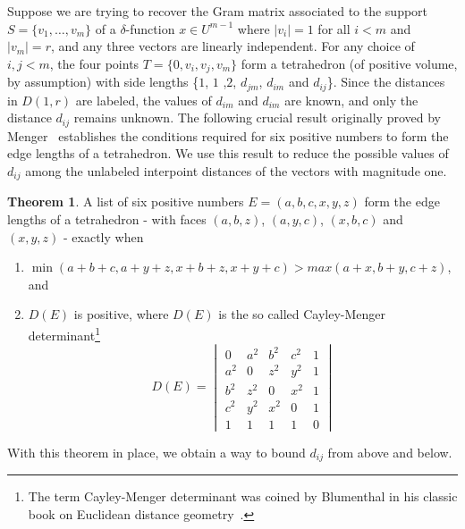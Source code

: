 \documentclass{article}
\theoremstyle{definition}
\newtheorem{Theorem}{Theorem}
\renewcommand{\|}{|}
\begin{document}
Suppose we are trying to recover
the Gram matrix associated to the support $S = \{v_1,\dots,v_m\}$ of a $\delta$-function $x \in U^{m-1}$ where $\|v_i\|=1$ for all $i<m$ and $\|v_m\|=r$,
and any three vectors are linearly independent.
For any choice of $i,j<m$, the four points $T = \{0, v_i, v_j, v_m\}$ form a tetrahedron (of positive volume, by assumption) with side lengths \{$1$, $1$ ,$2$, $d_{jm}$, $d_{im}$ and $d_{ij}$\}. Since the distances in $D(1,r)$ are labeled, the values of $d_{im}$ and $d_{im}$ are known, and only the distance $d_{ij}$ remains unknown. The following crucial result
originally proved by Menger~\cite{menger1928untersuchungen} establishes the conditions required for six positive numbers to form the edge lengths of a tetrahedron. We use this result to reduce the possible values of $d_{ij}$ among the unlabeled interpoint distances of the vectors with magnitude one.
\begin{Theorem}{\cite[Theorem 3.1]{wirth2009edge}}\label{thm:cayleymenger} A list of six positive numbers $E = (a,b,c, x, y, z)$ form the edge lengths of a tetrahedron - with faces $(a,b,z)$, $(a, y, c)$, $(x,b,c)$ and $(x,y,z)$ - exactly when 
\begin{enumerate}
    \item $\min(a+b+c,a+y+z,x+b+z,x+y+c)>max(a+x,b+y,c+z)$, and 
    \item $D(E)$ is positive, where $D(E)$ is the so called Cayley-Menger determinant\footnote{The term Cayley-Menger determinant was coined by Blumenthal in his classic book on Euclidean distance geometry~\cite{blumenthal1953theory}.}
    \begin{equation} D(E) = \begin{vmatrix} \label{eq.cayleymenger}
        0 & a^2 & b^2 & c^2 & 1 \\
        a^2 & 0 & z^2 & y^2 & 1\\
        b^2 & z^2 & 0 & x^2 & 1\\
        c^2 & y^2 & x^2 & 0 & 1 \\
        1 & 1 & 1 & 1 & 0 
    \end{vmatrix} \end{equation}
\end{enumerate}
\end{Theorem}

With this theorem in place, we obtain a way to bound $d_{ij}$ from above and below. 
\end{document}

